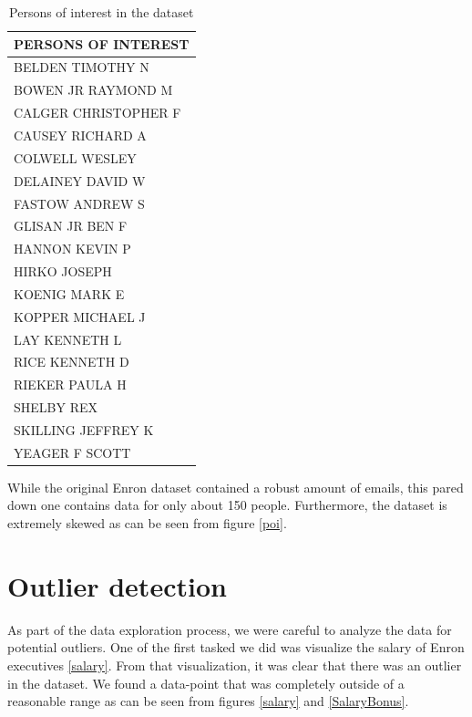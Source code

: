 \documentclass[twoside,openright,titlepage,numbers=noenddot,headinclude,%
               footinclude=true,cleardoublepage=empty,abstractoff,BCOR=5mm,%
               paper=a4,fontsize=11pt,ngerman,american]{scrreprt}
\numberwithin{theorem}{chapter}
\numberwithin{definition}{chapter}
\numberwithin{algorithm}{chapter}
\numberwithin{figure}{chapter}
\numberwithin{table}{chapter}
\numberwithin{equation}{chapter}
\begin{document}
\begin{table}[!htbp]
  \begin{center}
    \begin{tabular}{ |p{8cm}| } 
    \hline
    PERSONS OF INTEREST                \\ 

    \hline
    BELDEN TIMOTHY N    \\ 
    BOWEN JR RAYMOND M  \\ 
    CALGER CHRISTOPHER F\\ 
    CAUSEY RICHARD A    \\ 
    COLWELL WESLEY      \\ 
    DELAINEY DAVID W    \\ 
    FASTOW ANDREW S     \\ 
    GLISAN JR BEN F     \\ 
    HANNON KEVIN P      \\ 
    HIRKO JOSEPH        \\ 
    KOENIG MARK E       \\ 
    KOPPER MICHAEL J    \\ 
    LAY KENNETH L       \\ 
    RICE KENNETH D      \\ 
    RIEKER PAULA H      \\ 
    SHELBY REX          \\ 
    SKILLING JEFFREY K  \\ 
    YEAGER F SCOTT      \\ 
    \hline
    \end{tabular}
    \caption{Persons of interest in the dataset}
    \label{poiTable}
  \end{center}
\end{table}
While the original Enron dataset contained a robust amount of emails, this pared down one contains data for only about 150 people. Furthermore, the dataset is extremely skewed as can be seen from figure \ref{poi}.

\clearpage


\section*{Outlier detection}
 As part of the data exploration process, we were careful to analyze the data for potential outliers. One of the first tasked we did was visualize the salary of Enron executives \ref{salary}. From that visualization, it was clear that there was an outlier in the dataset. We found a data-point that was completely outside of a reasonable range as can be seen from figures \ref{salary} and \ref{SalaryBonus}. 
\end{document}
